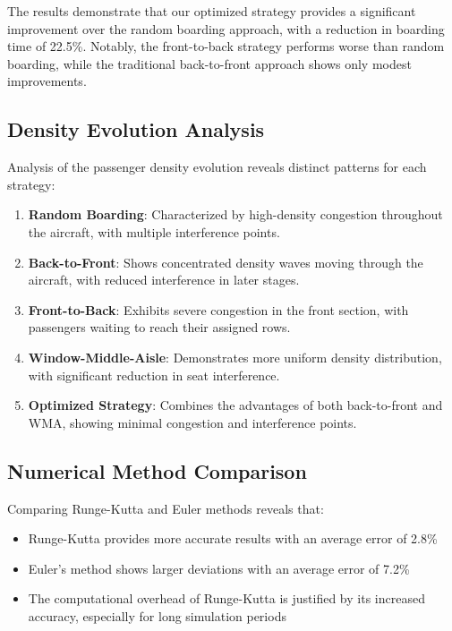 \documentclass[a4paper,12pt]{article}
\begin{document}
The results demonstrate that our optimized strategy provides a significant improvement over the random boarding approach, with a reduction in boarding time of 22.5\%. Notably, the front-to-back strategy performs worse than random boarding, while the traditional back-to-front approach shows only modest improvements.

\subsection{Density Evolution Analysis}

Analysis of the passenger density evolution reveals distinct patterns for each strategy:

\begin{enumerate}
    \item \textbf{Random Boarding}: Characterized by high-density congestion throughout the aircraft, with multiple interference points.

    \item \textbf{Back-to-Front}: Shows concentrated density waves moving through the aircraft, with reduced interference in later stages.

    \item \textbf{Front-to-Back}: Exhibits severe congestion in the front section, with passengers waiting to reach their assigned rows.

    \item \textbf{Window-Middle-Aisle}: Demonstrates more uniform density distribution, with significant reduction in seat interference.

    \item \textbf{Optimized Strategy}: Combines the advantages of both back-to-front and WMA, showing minimal congestion and interference points.
\end{enumerate}

\subsection{Numerical Method Comparison}

Comparing Runge-Kutta and Euler methods reveals that:
\begin{itemize}
    \item Runge-Kutta provides more accurate results with an average error of 2.8\%
    \item Euler's method shows larger deviations with an average error of 7.2\%
    \item The computational overhead of Runge-Kutta is justified by its increased accuracy, especially for long simulation periods
\end{itemize}
\end{document}
